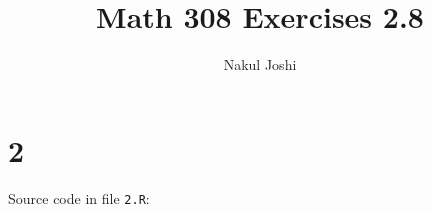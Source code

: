 \documentclass[twocolumn]{article}
\title{Math 308 Exercises 2.8}
\author{Nakul Joshi}
\newcommand{\includecode}[1]{}
\newcommand{\code}[1]{\lstinline{#1}}
\begin{document}
\lstset{language=R}
\maketitle

\section*{2}
Source code in file \code{2.R}:
\includecode{2-8/2.R}
%
\end{document}
